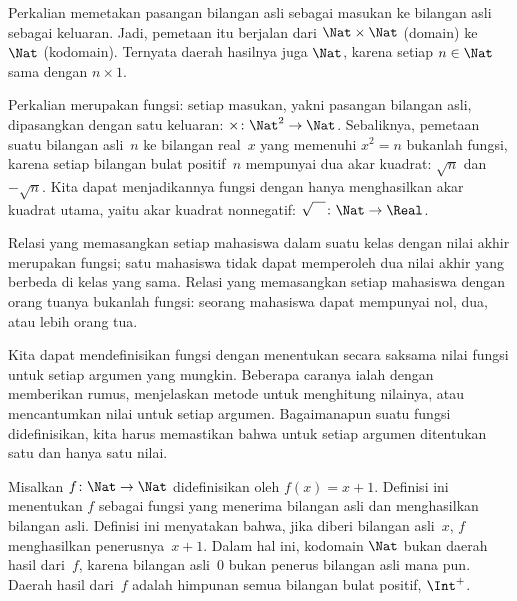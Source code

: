 \documentclass[../../../include/open-logic-section]{subfiles}
\begin{document}
\begin{ex}
Perkalian memetakan pasangan bilangan asli sebagai masukan ke bilangan asli
sebagai keluaran. Jadi, pemetaan itu berjalan dari $\Nat \times \Nat$ (domain)
ke $\Nat$ (kodomain). Ternyata daerah hasilnya juga
$\Nat$, karena setiap $n \in \Nat$ sama dengan $n \times 1$.
\end{ex}

\begin{ex}
Perkalian merupakan fungsi: setiap masukan, yakni pasangan bilangan asli,
dipasangkan dengan satu keluaran: $\times \colon \Nat^2 \to
\Nat$. Sebaliknya, pemetaan suatu bilangan asli~$n$ ke bilangan real~$x$ yang
memenuhi $x^2 = n$ bukanlah fungsi, karena setiap bilangan bulat positif~$n$
mempunyai dua akar kuadrat: $\sqrt{n}$ dan~$-\sqrt{n}$. Kita dapat menjadikannya
fungsi dengan hanya menghasilkan akar kuadrat utama, yaitu akar kuadrat nonnegatif:
$\sqrt{\phantom{X}} \colon \Nat \to \Real$.
\end{ex}

\begin{ex}
Relasi yang memasangkan setiap mahasiswa dalam suatu kelas dengan nilai akhir
merupakan fungsi; satu mahasiswa tidak dapat memperoleh dua nilai akhir yang
berbeda di kelas yang sama. Relasi yang memasangkan setiap mahasiswa dengan
orang tuanya bukanlah fungsi: seorang mahasiswa dapat
mempunyai nol, dua, atau lebih orang tua.
\end{ex}

\begin{explain}
Kita dapat mendefinisikan fungsi dengan menentukan secara saksama nilai fungsi
untuk setiap argumen yang mungkin. Beberapa caranya ialah dengan memberikan
rumus, menjelaskan metode untuk menghitung nilainya, atau mencantumkan nilai
untuk setiap argumen. Bagaimanapun suatu fungsi didefinisikan, kita harus
memastikan bahwa untuk setiap argumen ditentukan satu dan hanya satu nilai.
\end{explain}


\begin{ex}
Misalkan $f \colon \Nat \to \Nat$ didefinisikan oleh $f(x) = x+1$. Definisi
ini menentukan $f$ sebagai fungsi yang menerima bilangan asli dan menghasilkan
bilangan asli. Definisi ini menyatakan bahwa, jika diberi bilangan asli~$x$,
$f$ menghasilkan penerusnya~$x+1$.
Dalam hal ini, kodomain $\Nat$ bukan daerah hasil dari~$f$, karena bilangan
asli~$0$ bukan penerus bilangan asli mana pun. Daerah hasil dari~$f$ adalah
himpunan semua bilangan bulat positif, $\Int^{+}$.
\end{ex}
\end{document}
